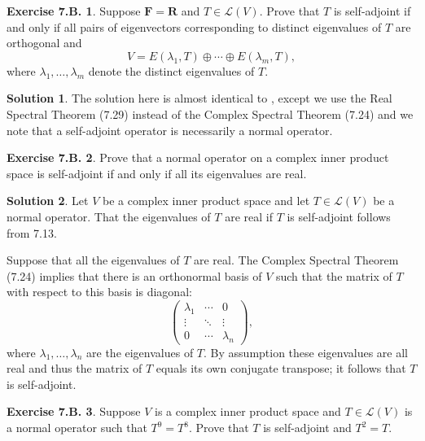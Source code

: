 \documentclass[12pt]{article}
\theoremstyle{definition}
\theoremstyle{exercise}
\newtheorem{exercise}{Exercise 7.B.}
\theoremstyle{solution}
\newtheorem*{solution}{Solution}
\newcommand{\lmap}{\mathcal{L}}
\newcommand{\R}{\mathbf{R}}
\newcommand{\F}{\mathbf{F}}
\begin{document}
\begin{exercise}
\label{ex:5}
    Suppose \( \F = \R \) and \( T \in \lmap(V) \). Prove that \( T \) is self-adjoint if and only if all pairs of eigenvectors corresponding to distinct eigenvalues of \( T \) are orthogonal and
    \[
        V = E(\lambda_1, T) \oplus \cdots \oplus E(\lambda_m, T),
    \]
    where \( \lambda_1, \ldots, \lambda_m \) denote the distinct eigenvalues of \( T \).
\end{exercise}

\begin{solution}
    The solution here is almost identical to , except we use the Real Spectral Theorem (7.29) instead of the Complex Spectral Theorem (7.24) and we note that a self-adjoint operator is necessarily a normal operator.
\end{solution}

\begin{exercise}
\label{ex:6}
    Prove that a normal operator on a complex inner product space is self-adjoint if and only if all its eigenvalues are real.

\end{exercise}

\begin{solution}
    Let \( V \) be a complex inner product space and let \( T \in \lmap(V) \) be a normal operator. That the eigenvalues of \( T \) are real if \( T \) is self-adjoint follows from 7.13.

    Suppose that all the eigenvalues of \( T \) are real. The Complex Spectral Theorem (7.24) implies that there is an orthonormal basis of \( V \) such that the matrix of \( T \) with respect to this basis is diagonal:
    \[
        \begin{pmatrix}
            \lambda_1 & \cdots & 0 \\
            \vdots & \ddots & \vdots \\
            0 & \cdots & \lambda_n
        \end{pmatrix},
    \]
    where \( \lambda_1, \ldots, \lambda_n \) are the eigenvalues of \( T \). By assumption these eigenvalues are all real and thus the matrix of \( T \) equals its own conjugate transpose; it follows that \( T \) is self-adjoint.
\end{solution}

\begin{exercise}
\label{ex:7}
    Suppose \( V \) is a complex inner product space and \( T \in \lmap(V) \) is a normal operator such that \( T^9 = T^8 \). Prove that \( T \) is self-adjoint and \( T^2 = T \).
\end{exercise}
\end{document}
